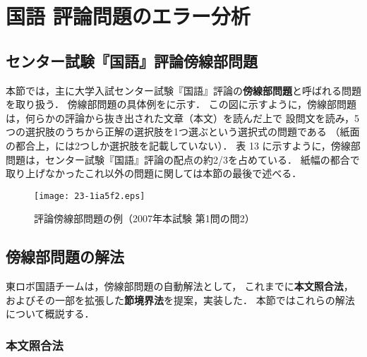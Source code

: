 \documentclass[japanese]{jnlp_1.4b}
\def\FIGREF#1{}
\begin{document}
\vspace{0.5\Cvs}
\section{国語 評論問題のエラー分析}

\vspace{0.5\Cvs}
\subsection{センター試験『国語』評論傍線部問題}

本節では，主に大学入試センター試験『国語』評論の{\bf 傍線部問題}と呼ばれる問題を取り扱う．
傍線部問題の具体例を\FIGREF{fig:kokugo:up_example}に示す．
この図に示すように，傍線部問題は，何らかの評論から抜き出された文章（本文）を読んだ上で
設問文を読み，5つの選択肢のうちから正解の選択肢を1つ選ぶという選択式の問題である
（紙面の都合上，\FIGREF{fig:kokugo:up_example}には2つしか選択肢を記載していない）．
表 13 に示すように，傍線部問題は，センター試験『国語』評論の配点の約2/3を占めている．
紙幅の都合で取り上げなかったこれ以外の問題に関しては本節の最後で述べる．

\begin{figure}[t]
\begin{center}
\texttt{[image: 23-1ia5f2.eps]}
\end{center}
\caption{評論傍線部問題の例（2007年本試験 第1問の問2）}
\label{fig:kokugo:up_example}
\end{figure}


\subsection{傍線部問題の解法}

東ロボ国語チームは，傍線部問題の自動解法として，
これまでに{\bf 本文照合法}\cite{BaseMethod}，
およびその一部を拡張した{\bf 節境界法}\cite{CLMethod}を提案，実装した．
本節ではこれらの解法について概説する．


\subsubsection{本文照合法}
\end{document}

